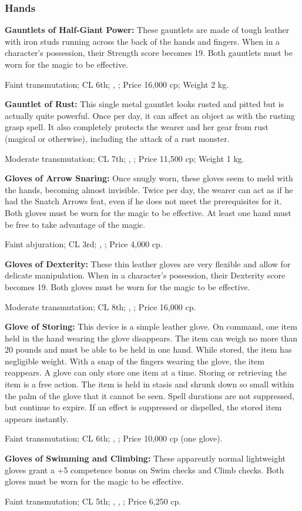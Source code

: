 \subsubsection{Hands}

\textbf{Gauntlets of Half-Giant Power:} These gauntlets are made of tough leather with iron studs running across the back of the hands and fingers. When in a character's possession, their Strength score becomes 19. Both gauntlets must be worn for the magic to be effective.

Faint transmutation; CL 6th; , ; Price 16,000 cp; Weight 2 kg.

\textbf{Gauntlet of Rust:} This single metal gauntlet looks rusted and pitted but is actually quite powerful. Once per day, it can affect an object as with the rusting grasp spell. It also completely protects the wearer and her gear from rust (magical or otherwise), including the attack of a rust monster.

Moderate transmutation; CL 7th; , ; Price 11,500 cp; Weight 1 kg.

\textbf{Gloves of Arrow Snaring:} Once snugly worn, these gloves seem to meld with the hands, becoming almost invisible. Twice per day, the wearer can act as if he had the Snatch Arrows feat, even if he does not meet the prerequisites for it. Both gloves must be worn for the magic to be effective. At least one hand must be free to take advantage of the magic.

Faint abjuration; CL 3rd; , ; Price 4,000 cp.

\textbf{Gloves of Dexterity:} These thin leather gloves are very flexible and allow for delicate manipulation. When in a character's possession, their Dexterity score becomes 19. Both gloves must be worn for the magic to be effective.

Moderate transmutation; CL 8th; , ; Price 16,000 cp.

\textbf{Glove of Storing:} This device is a simple leather glove. On command, one item held in the hand wearing the glove disappears. The item can weigh no more than 20 pounds and must be able to be held in one hand. While stored, the item has negligible weight. With a snap of the fingers wearing the glove, the item reappears. A glove can only store one item at a time. Storing or retrieving the item is a free action. The item is held in stasis and shrunk down so small within the palm of the glove that it cannot be seen. Spell durations are not suppressed, but continue to expire. If an effect is suppressed or dispelled, the stored item appears instantly.

Faint transmutation; CL 6th; , ; Price 10,000 cp (one glove).

\textbf{Gloves of Swimming and Climbing:} These apparently normal lightweight gloves grant a +5 competence bonus on Swim checks and Climb checks. Both gloves must be worn for the magic to be effective.

Faint transmutation; CL 5th; , , ; Price 6,250 cp.
